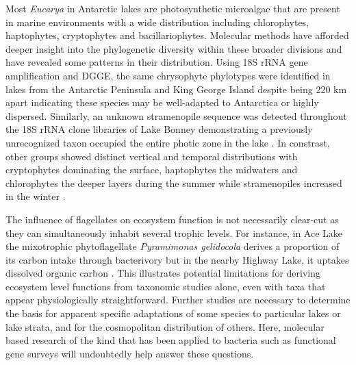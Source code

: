 Most \emph{Eucarya} in Antarctic lakes are photosynthetic microalgae that are present in marine environments with a wide distribution including chlorophytes, haptophytes, cryptophytes and bacillariophytes.
Molecular methods have afforded deeper insight into the phylogenetic diversity within these broader divisions and have revealed some patterns in their distribution. 
Using 18S \ac{rRNA} gene amplification and \ac{DGGE}, the same chrysophyte phylotypes were identified in lakes from the Antarctic Peninsula and King George Island 
despite being 220 km apart \cite{Unrein2005} indicating these species may be well-adapted to Antarctica or highly dispersed.
Similarly, an unknown stramenopile sequence was detected throughout the 18S \ac{rRNA} clone libraries of Lake Bonney 
demonstrating a previously unrecognized taxon occupied the entire photic zone in the lake \cite{Bielewicz2011}. 
In constrast, other groups showed distinct vertical and temporal distributions with cryptophytes dominating the surface, 
haptophytes the midwaters and chlorophytes the deeper layers during the summer while stramenopiles increased in the winter \cite{Bielewicz2011}. 

The influence of flagellates on ecosystem function is not necessarily clear-cut as they can simultaneously inhabit several trophic levels. 
For instance, in Ace Lake the mixotrophic phytoflagellate \emph{Pyramimonas gelidocola} derives a proportion of its carbon intake through bacterivory \cite{Bell2003} but in the nearby Highway Lake, it uptakes dissolved organic carbon \cite{Laybourn-Parry2005}. 
This illustrates potential limitations for deriving ecosystem level functions from taxonomic studies alone, even with taxa that appear physiologically straightforward. 
Further studies are necessary to determine the basis for apparent specific adaptations of some species to particular lakes or lake strata, and for the cosmopolitan distribution of others.
Here, molecular based research of the kind that has been applied to bacteria such as functional gene surveys will undoubtedly help answer these questions.


